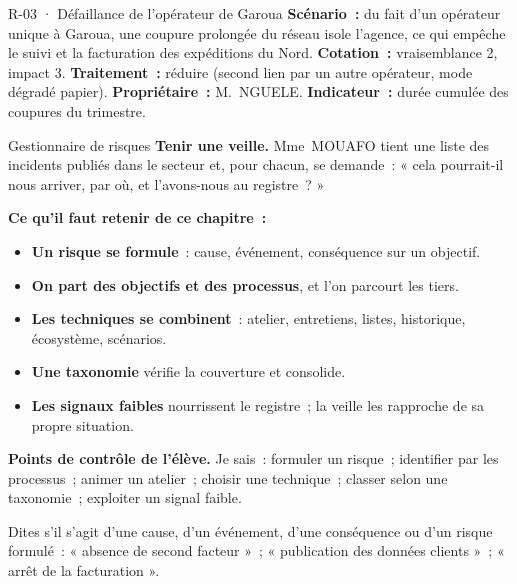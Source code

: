 \begin{boxobjet}{R-03 · Défaillance de l'opérateur de Garoua}
\textbf{Scénario~:} du fait d'un opérateur unique à Garoua, une coupure
prolongée du réseau isole l'agence, ce qui empêche le suivi et la
facturation des expéditions du Nord. \textbf{Cotation~:} vraisemblance 2,
impact 3. \textbf{Traitement~:} réduire (second lien par un autre
opérateur, mode dégradé papier). \textbf{Propriétaire~:} M.~NGUELE.
\textbf{Indicateur~:} durée cumulée des coupures du trimestre.
\end{boxobjet}

\begin{boxmetier}{Gestionnaire de risques}
\textbf{Tenir une veille.} Mme~MOUAFO tient une liste des incidents
publiés dans le secteur et, pour chacun, se demande~: « cela pourrait-il
nous arriver, par où, et l'avons-nous au registre~? »
\end{boxmetier}

\separateur

\begin{boxresume}
\textbf{Ce qu'il faut retenir de ce chapitre~:}
\begin{itemize}
    \item \textbf{Un risque se formule}~: cause, événement, conséquence sur
          un objectif.
    \item \textbf{On part des objectifs et des processus}, et l'on parcourt
          les tiers.
    \item \textbf{Les techniques se combinent}~: atelier, entretiens,
          listes, historique, écosystème, scénarios.
    \item \textbf{Une taxonomie} vérifie la couverture et consolide.
    \item \textbf{Les signaux faibles} nourrissent le registre~; la veille
          les rapproche de sa propre situation.
\end{itemize}
\end{boxresume}

\begin{boxinfo}
\textbf{Points de contrôle de l'élève.} Je sais~: formuler un risque~;
identifier par les processus~; animer un atelier~; choisir une technique~;
classer selon une taxonomie~; exploiter un signal faible.
\end{boxinfo}

\bigskip

\begin{boxexo}[title={\ding{45}\quad Exercice~6.1. Diagnostiquer \niveaubase}]
Dites s'il s'agit d'une cause, d'un événement, d'une conséquence ou d'un
risque formulé~: « absence de second facteur »~; « publication des données
clients »~; « arrêt de la facturation ».
\end{boxexo}

